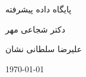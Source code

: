\documentclass[a4paper]{article}
\begin{document}
\centerline{پایگاه داده پیشرفته}
\centerline{دکتر شجاعی مهر}
\centerline{علیرضا سلطانی نشان}
\centerline{\today}
\tableofcontents
\newpage







\end{document}
